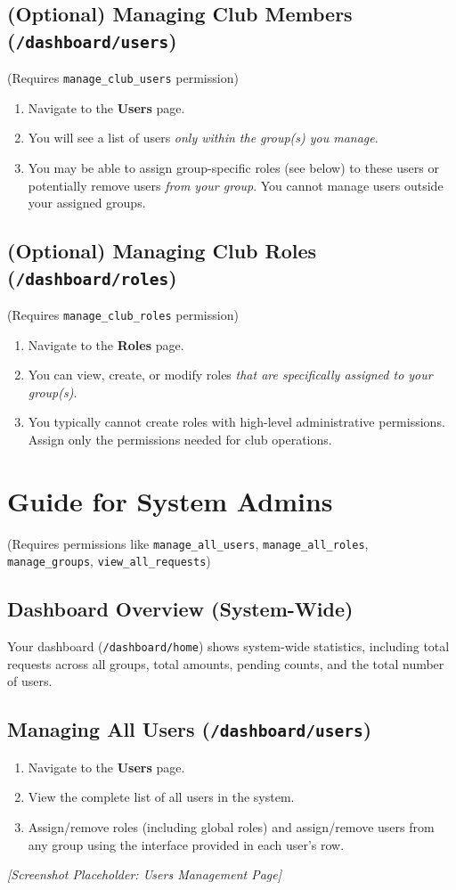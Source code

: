 \documentclass{article}
\begin{document}
\subsection{(Optional) Managing Club Members (\texttt{/dashboard/users})}
(Requires \texttt{manage\_club\_users} permission)
\begin{enumerate}
    \item Navigate to the \textbf{Users} page.
    \item You will see a list of users \textit{only within the group(s) you manage}.
    \item You may be able to assign group-specific roles (see below) to these users or potentially remove users \textit{from your group}. You cannot manage users outside your assigned groups.
\end{enumerate}

\subsection{(Optional) Managing Club Roles (\texttt{/dashboard/roles})}
(Requires \texttt{manage\_club\_roles} permission)
\begin{enumerate}
    \item Navigate to the \textbf{Roles} page.
    \item You can view, create, or modify roles \textit{that are specifically assigned to your group(s)}.
    \item You typically cannot create roles with high-level administrative permissions. Assign only the permissions needed for club operations.
\end{enumerate}

\section{Guide for System Admins}
(Requires permissions like \texttt{manage\_all\_users}, \texttt{manage\_all\_roles}, \texttt{manage\_groups}, \texttt{view\_all\_requests})

\subsection{Dashboard Overview (System-Wide)}
Your dashboard (\texttt{/dashboard/home}) shows system-wide statistics, including total requests across all groups, total amounts, pending counts, and the total number of users.

\subsection{Managing All Users (\texttt{/dashboard/users})}
\begin{enumerate}
    \item Navigate to the \textbf{Users} page.
    \item View the complete list of all users in the system.
    \item Assign/remove roles (including global roles) and assign/remove users from any group using the interface provided in each user's row.
\end{enumerate}
\textit{[Screenshot Placeholder: Users Management Page]}
\end{document}

